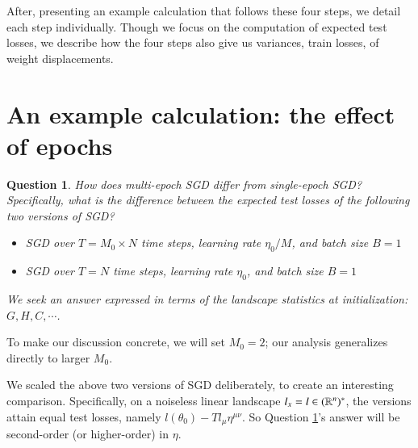 \documentclass[openany, notitlepage, justified]{tufte-book}
\theoremstyle{plain}
\newtheorem{quest}{Question}
\theoremstyle{definition}
\begin{document}
    After, presenting an example calculation that follows these four steps,
    we detail each step individually.  Though we focus on the computation of
    expected test losses, we describe how the four steps also give us
    variances, train losses, of weight displacements.  

    \section{An example calculation: the effect of epochs}       %

        \begin{quest}\label{qst:multi}
            How does multi-epoch SGD differ from single-epoch SGD?
            Specifically, what is the difference between the expected
            test losses of the following two versions of SGD?
            \begin{itemize}
                \item SGD over $T=M_0 \times N$ time steps, learning rate $\eta_0/M$, and
                    batch size $B=1$
                \item SGD over $T=N$ time steps, learning rate $\eta_0$, and batch size $B=1$
            \end{itemize}
            We seek an answer expressed in terms of the landscape statistics
            at initialization: $G,H,C, \cdots$.
        \end{quest}
        To make our discussion concrete, we will set $M_0=2$; our analysis 
        generalizes directly to larger $M_0$.

        We scaled the above two versions of SGD deliberately, to create an
        interesting comparison.
        Specifically, on a noiseless
        linear landscape $l_x=l \in (\mathbb{R}^n)^*$, the versions
        attain equal test losses, namely $l(\theta_0) - T l_\mu \eta^{\mu\nu}$.
        So Question \ref{qst:multi}'s answer will be second-order (or
        higher-order) in $\eta$.
\end{document}
